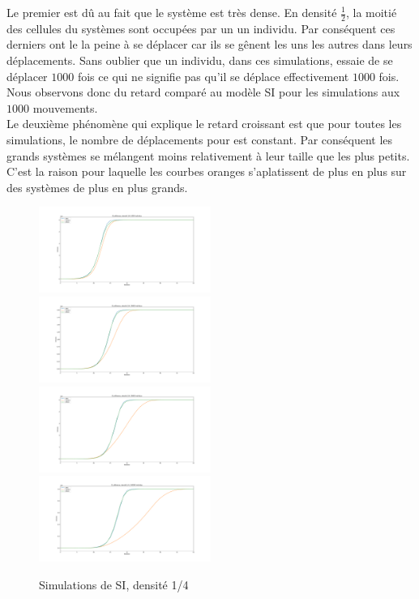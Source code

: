 Le premier est dû au fait que le système est très dense. En densité $\frac{1}{2}$, la moitié des cellules du systèmes sont occupées par un un individu. Par conséquent ces derniers ont le la peine à se déplacer car ils se gênent les uns les autres dans leurs déplacements. Sans oublier que un individu, dans ces simulations, essaie de se déplacer $1000$ fois ce qui ne signifie pas qu'il se déplace effectivement $1000$ fois. Nous observons donc du retard comparé au modèle SI pour les simulations aux $1000$ mouvements. \\

Le deuxième phénomène qui explique le retard croissant est que pour toutes les simulations, le nombre de déplacements pour est constant. Par conséquent les grands systèmes se mélangent moins relativement à leur taille que les plus petits. C'est la raison pour laquelle les courbes oranges s'aplatissent de plus en plus sur des systèmes de plus en plus grands.\\

\newpage

\begin{figure}
    \centering
    \captionsetup{justification=centering}
    \includegraphics[width=0.5\textwidth]{Images/SI_ref_4_5k.pdf}
    \includegraphics[width=0.5\textwidth]{Images/SI_ref_4_20k.pdf}
    \includegraphics[width=0.5\textwidth]{Images/SI_ref_4_50k.pdf}
    \includegraphics[width=0.5\textwidth]{Images/SI_ref_4_100k.pdf}
    \caption{Simulations de SI, densité 1/4}
\end{figure}

